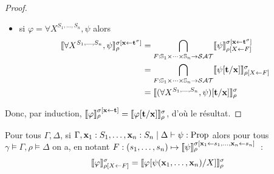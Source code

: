 \documentclass{article}
\begin{document}
\begin{proof}
\begin{itemize}
  \item si $\varphi = \forall X^{S_1,\ldots,S_n}, \psi$ alors
    \begin{align*}
      \llbracket \forall X^{S_1,\ldots,S_n}, \psi \rrbracket_\rho^{\sigma[\mathbf{x}\leftarrow \mathbf{t}^\sigma]} &= \bigcap_{F : \mathbb{S}_1\times\cdots\times \mathbb{S}_n\to \mathcal {SAT}}\llbracket \psi \rrbracket_{\rho[X\leftarrow F]}^{\sigma[\mathbf{x}\leftarrow \mathbf{t}^\sigma]}\\
      &= \bigcap_{F : \mathbb{S}_1\times\cdots\times \mathbb{S}_n \to \mathcal {SAT}}\llbracket \psi[\mathbf{t}/\mathbf{x}] \rrbracket_{\rho[X\leftarrow F]}^\sigma\\
      &= \llbracket (\forall X^{S_1,\ldots,S_n}, \psi)[\mathbf{t}/\mathbf{x}] \rrbracket_\rho^\sigma
    \end{align*}
  \end{itemize}
  Donc, par induction, $\llbracket \varphi \rrbracket_\rho^{\sigma[\mathbf{x}\leftarrow\mathbf{t}]} = \llbracket \varphi[\mathbf{t}/\mathbf{x}] \rrbracket_\rho^\sigma$, d'où le résultat.
\end{proof}

\begin{lem}\label{lem.subst.2}
  Pour tous $\Gamma,\Delta$, si $\Gamma,\mathbf{x}_1 : S_1,\ldots,\mathbf{x}_n : S_n\mid\Delta\vdash \psi : \mathrm{Prop}$ alors pour tous $\gamma\models\Gamma, \rho\models \Delta$ on a, en notant $F : (s_1,\ldots,s_n) \mapsto \llbracket \psi \rrbracket_\rho^{\sigma[\mathbf{x}_1\leftarrow s_1,\ldots,\mathbf{x}_n\leftarrow s_n]}$~:
  \[\llbracket \varphi \rrbracket_{\rho[X\leftarrow F]}^\sigma = \llbracket \varphi[\psi(\mathbf{x}_1,\ldots,\mathbf{x}_n)/X] \rrbracket_\rho^\sigma \]
\end{lem}
\end{document}
